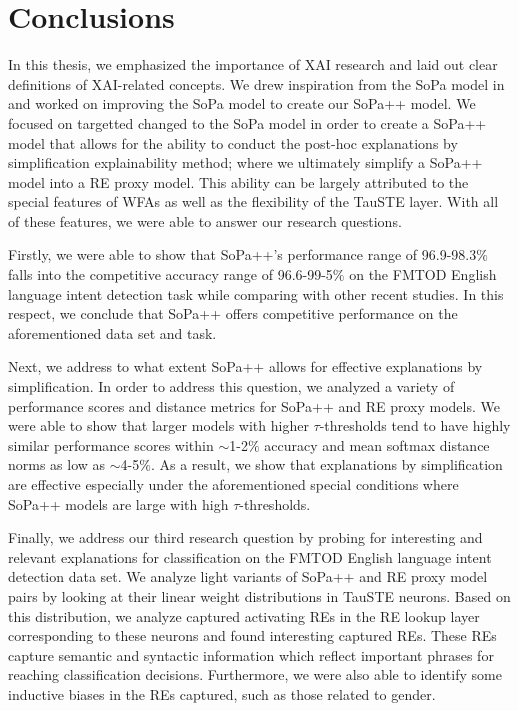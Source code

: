 \chapter{Conclusions}

In this thesis, we emphasized the importance of XAI research and laid out clear
definitions of XAI-related concepts. We drew inspiration from the SoPa model in
\citet{schwartz2018sopa} and worked on improving the SoPa model to create our
SoPa++ model. We focused on targetted changed to the SoPa model in order to
create a SoPa++ model that allows for the ability to conduct the post-hoc
explanations by simplification explainability method; where we ultimately
simplify a SoPa++ model into a RE proxy model. This ability can be largely
attributed to the special features of WFAs as well as the flexibility of the
TauSTE layer. With all of these features, we were able to answer our research
questions.

Firstly, we were able to show that SoPa++'s performance range of 96.9-98.3$\%$
falls into the competitive accuracy range of 96.6-99-5$\%$ on the FMTOD English
language intent detection task while comparing with other recent studies. In
this respect, we conclude that SoPa++ offers competitive performance on the
aforementioned data set and task.

Next, we address to what extent SoPa++ allows for effective explanations by
simplification. In order to address this question, we analyzed a variety of
performance scores and distance metrics for SoPa++ and RE proxy models. We were
able to show that larger models with higher $\tau$-thresholds tend to have
highly similar performance scores within $\sim$1-2$\%$ accuracy and mean softmax
distance norms as low as $\sim$4-5$\%$. As a result, we show that explanations
by simplification are effective especially under the aforementioned special
conditions where SoPa++ models are large with high $\tau$-thresholds.

Finally, we address our third research question by probing for interesting and
relevant explanations for classification on the FMTOD English language intent
detection data set. We analyze light variants of SoPa++ and RE proxy model pairs
by looking at their linear weight distributions in TauSTE neurons. Based on this
distribution, we analyze captured activating REs in the RE lookup layer
corresponding to these neurons and found interesting captured REs. These REs
capture semantic and syntactic information which reflect important phrases for
reaching classification decisions. Furthermore, we were also able to identify
some inductive biases in the REs captured, such as those related to gender.

